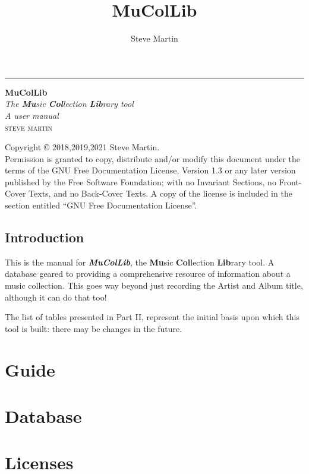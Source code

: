 \documentclass[12pt,a4paper,final,twoside,titlepage]{book}
\author{\LARGE Steve Martin}
\title{\Huge MuColLib}
\begin{document}
\begin{titlepage} %
	\raggedleft
	\rule{1pt}{\textheight} %
	\hspace{0.05\textwidth} %
	\parbox[b]{0.75\textwidth}{ %
		{\Huge\bfseries MuColLib}\\[2\baselineskip] %
		{\large\textit{The \textbf{Mu}sic \textbf{Col}lection \textbf{Lib}rary tool}}\\
		{\large\textit{A user manual}}\\[4\baselineskip] %
		{\Large\textsc{steve martin}} %
		\vspace{0.5\textheight} %
	}
\end{titlepage}
\thispagestyle{empty}
\null
\vfill
\bigskip
\noindent Copyright \copyright{} 2018,2019,2021  Steve Martin.\\
Permission is granted to copy, distribute and/or modify this document
under the terms of the GNU Free Documentation License, Version 1.3
or any later version published by the Free Software Foundation;
with no Invariant Sections, no Front-Cover Texts, and no Back-Cover Texts.
A copy of the license is included in the section entitled ``GNU
Free Documentation License''.
\bigskip
\frontmatter
\tableofcontents
\listoffigures
\listoftables
\newpage
\chapter{Introduction}
This is the manual for \textbf{\textit{MuColLib}}, the \textbf{Mu}sic \textbf{Col}lection \textbf{Lib}rary tool. A database geared to providing a comprehensive resource of information about a music collection.  This goes way beyond just recording the Artist and Album title, although it can do that too!

The list of tables presented in Part II, represent the initial basis upon which this tool is built: there may be changes in the future.
 
\mainmatter
\part{Guide}



\part{Database}

\part{Licenses}


\end{document}
